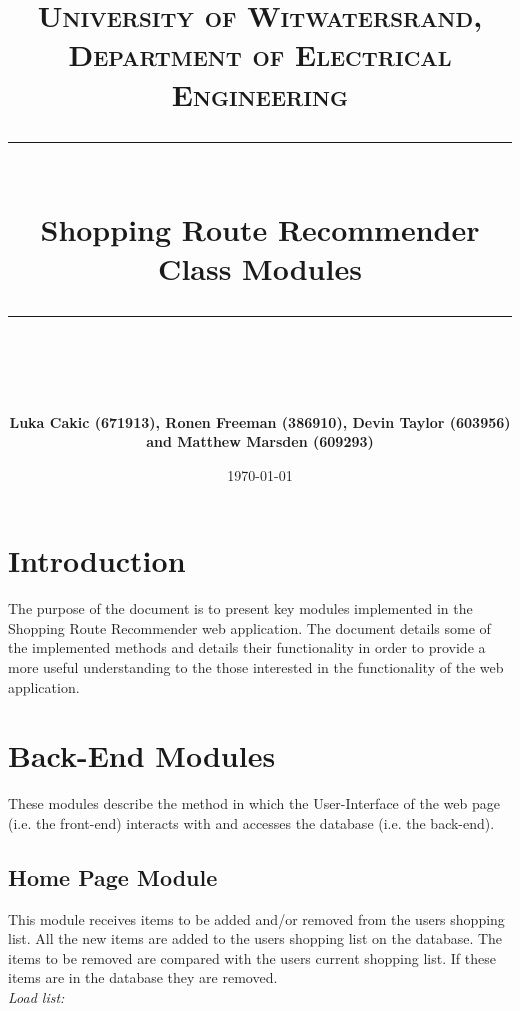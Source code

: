 \documentclass[10pt, a4paper, twocolumn]{scrartcl}
\newcommand{\horrule}[1]{\rule{\linewidth}{#1}}
\begin{document}
	
	\title{\normalfont \normalsize
		\textsc{University of Witwatersrand, Department of Electrical Engineering} \\ [10pt]
		\horrule{0.5pt} \\ [10pt]
		\huge Shopping Route Recommender Class Modules \\
		\horrule{2pt} \\ [10pt]}
	\author{\textbf{\normalsize{Luka Cakic (671913), Ronen Freeman (386910), Devin Taylor (603956) and Matthew Marsden (609293)}} \\ [10pt]}
	\date {\normalsize \today}
	
	\maketitle
	

	\section{Introduction}
	
		 The purpose of the document is to present key modules implemented in the Shopping Route Recommender web application. The document details some of the implemented methods and details their functionality in order to provide a more useful understanding to the those interested in the functionality of the web application. \\
		
	\section{Back-End Modules}
	
		These modules describe the method in which the User-Interface of the web page (i.e. the front-end) interacts with and accesses the database (i.e. the back-end).\\
	
		\subsection{Home Page Module}
			
			This module receives items to be added and/or removed from the users shopping list. All the new items are added to the users shopping list on the database. The items to be removed are compared with the users current shopping list. If these items are in the database they are removed.\\
			
			\textit{Load list:}
			
\end{document}
